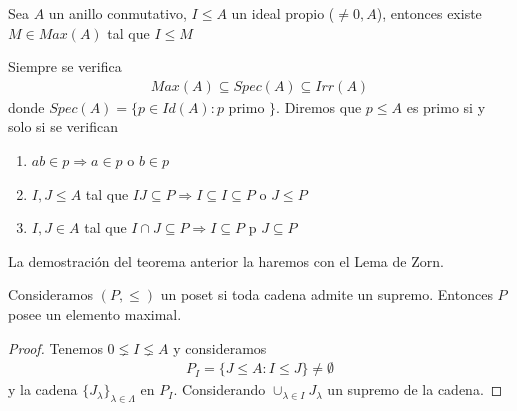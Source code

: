 \begin{teo}
    Sea $A$ un anillo conmutativo, $I\leq A$ un ideal propio ($\neq 0, A$), entonces existe $M\in Max(A)$ tal que $I \leq M$
\end{teo}
Siempre se verifica 
\begin{gather*}
    Max(A) \subseteq Spec(A)  \subseteq Irr(A)
\end{gather*}
donde $Spec(A)=\{p\in Id(A) : p \text{ primo }\}$. Diremos que $p\leq A$ es primo si y solo si se verifican 
\begin{enumerate}
    \item $ab\in p \Rightarrow a\in p$ o $b\in p$
    \item $I,J\leq A$ tal que $IJ \subseteq P \Rightarrow I \subseteq I\subseteq P$ o $J\leq P$
    \item $I,J\in A$ tal que $I\cap J \subseteq P \Rightarrow I \subseteq P$ p $J\subseteq P$
\end{enumerate}

La demostración del teorema anterior la haremos con el Lema de Zorn. 
\begin{lema}
    Consideramos $(P, \leq)$ un poset si toda cadena admite un supremo. Entonces $P$ posee un elemento maximal.
\end{lema}

\begin{proof}
    Tenemos $0\lneq I \lneq A$ y consideramos
    \begin{gather*}
        P_I = \{J \leq A : I \leq J\} \neq \emptyset
    \end{gather*}
    y la cadena $\{J_\lambda\}_{\lambda\in \Lambda}$ en $P_I$.
    Considerando $\cup_{\lambda \in I} J_\lambda$ un supremo de la cadena.
\end{proof}

\begin{lema}
    
\end{lema}
 



